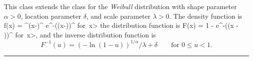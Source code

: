 
This class extends the class  for
the {\em Weibull\/} distribution \cite[page 628]{tJOH95a} with shape parameter
$\alpha > 0$, location parameter $\delta$, and scale parameter
$\lambda > 0$.
The density function is
\eq
  f(x) = \alpha\lambda^{\alpha}(x-\delta)^{}
       e^{-(\lambda(x-\delta))^{\alpha}}
 \qquad\mbox{for }x>\delta\latex{,} 
\endeq
the distribution function is
\eq
   F(x) = 1 - e^{-(\lambda (x - \delta))^\alpha}
 \qquad\mbox{for }x>\delta,               
\endeq
and the inverse distribution function is
$$
     F^{-1}(u) = (-\ln (1-u))^{1/\alpha}/\lambda
                 + \delta \qquad \mbox{for } 0 \le u < 1.
$$

\bigskip\hrule


